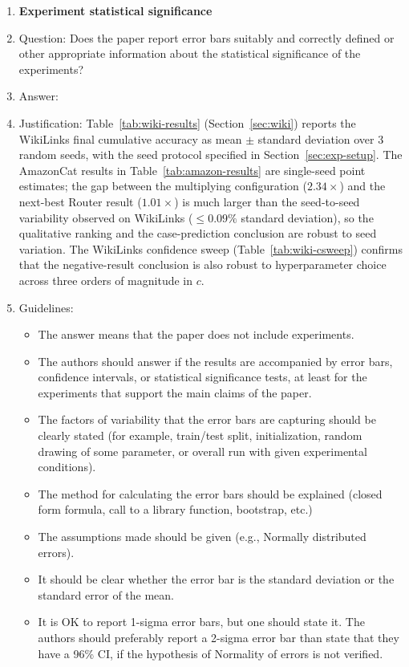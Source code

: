 \documentclass{article}
\theoremstyle{definition}
\theoremstyle{remark}
\theoremstyle{remark}
\begin{document}
\begin{enumerate}
\item {\bf Experiment statistical significance}
    \item[] Question: Does the paper report error bars suitably and correctly defined or other appropriate information about the statistical significance of the experiments?
    \item[] Answer: \answerYes{} %
    \item[] Justification: Table~\ref{tab:wiki-results} (Section~\ref{sec:wiki}) reports the WikiLinks final cumulative accuracy as mean $\pm$ standard deviation over 3 random seeds, with the seed protocol specified in Section~\ref{sec:exp-setup}. The AmazonCat results in Table~\ref{tab:amazon-results} are single-seed point estimates; the gap between the multiplying configuration ($2.34\times$) and the next-best Router result ($1.01\times$) is much larger than the seed-to-seed variability observed on WikiLinks ($\le 0.09\%$ standard deviation), so the qualitative ranking and the case-prediction conclusion are robust to seed variation. The WikiLinks confidence sweep (Table~\ref{tab:wiki-csweep}) confirms that the negative-result conclusion is also robust to hyperparameter choice across three orders of magnitude in $c$.
    \item[] Guidelines:
    \begin{itemize}
        \item The answer \answerNA{} means that the paper does not include experiments.
        \item The authors should answer \answerYes{} if the results are accompanied by error bars, confidence intervals, or statistical significance tests, at least for the experiments that support the main claims of the paper.
        \item The factors of variability that the error bars are capturing should be clearly stated (for example, train/test split, initialization, random drawing of some parameter, or overall run with given experimental conditions).
        \item The method for calculating the error bars should be explained (closed form formula, call to a library function, bootstrap, etc.)
        \item The assumptions made should be given (e.g., Normally distributed errors).
        \item It should be clear whether the error bar is the standard deviation or the standard error of the mean.
        \item It is OK to report 1-sigma error bars, but one should state it. The authors should preferably report a 2-sigma error bar than state that they have a 96\% CI, if the hypothesis of Normality of errors is not verified.

\end{itemize}
\end{enumerate}
\end{document}
